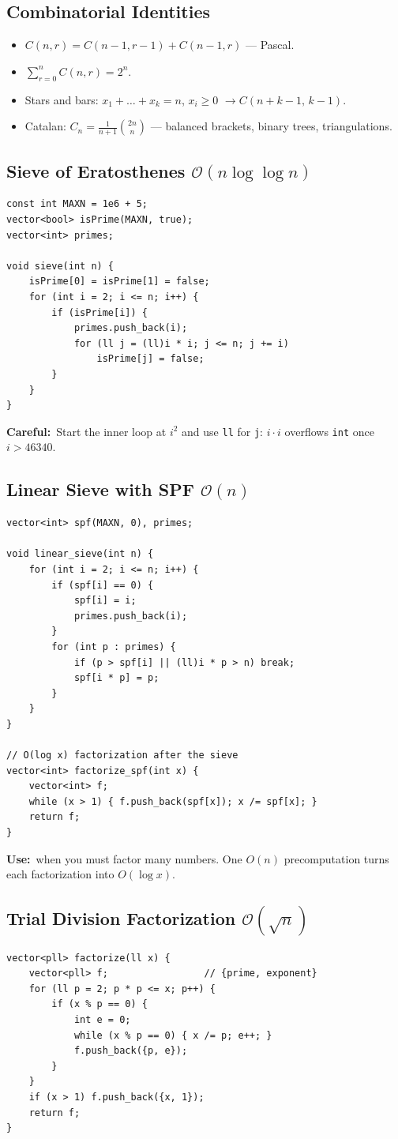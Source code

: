 \documentclass[10pt]{article}
\newcommand{\code}[1]{\texttt{\small #1}}
\newcommand{\sub}[2]{\subsection[#1]{#1\hspace{0.6em}%
  \textnormal{\color{accent2}\small$\mathcal{O}(#2)$}}}
\newcommand{\uses}[1]{{\color{accent2}\footnotesize\textbf{Use:}}~{\footnotesize #1}\par}
\newcommand{\warn}[1]{{\color{warnc}\footnotesize\textbf{Careful:}}~{\footnotesize #1}\par}
\begin{document}
\begin{multicols}{2}
\subsection{Combinatorial Identities}
\begin{itemize}
    \item $C(n,r) = C(n-1,r-1) + C(n-1,r)$ --- Pascal.
    \item $\sum_{r=0}^{n} C(n,r) = 2^n$.
    \item Stars and bars: $x_1+\dots+x_k=n$, $x_i \ge 0$
          $\rightarrow C(n+k-1,\,k-1)$.
    \item Catalan: $C_n = \frac{1}{n+1}\binom{2n}{n}$ --- balanced
          brackets, binary trees, triangulations.
\end{itemize}

\sub{Sieve of Eratosthenes}{n \log\log n}
\begin{lstlisting}
const int MAXN = 1e6 + 5;
vector<bool> isPrime(MAXN, true);
vector<int> primes;

void sieve(int n) {
    isPrime[0] = isPrime[1] = false;
    for (int i = 2; i <= n; i++) {
        if (isPrime[i]) {
            primes.push_back(i);
            for (ll j = (ll)i * i; j <= n; j += i)
                isPrime[j] = false;
        }
    }
}
\end{lstlisting}
\warn{Start the inner loop at $i^2$ and use \code{ll} for \code{j}:
$i \cdot i$ overflows \code{int} once $i > 46340$.}

\sub{Linear Sieve with SPF}{n}
\begin{lstlisting}
vector<int> spf(MAXN, 0), primes;

void linear_sieve(int n) {
    for (int i = 2; i <= n; i++) {
        if (spf[i] == 0) {
            spf[i] = i;
            primes.push_back(i);
        }
        for (int p : primes) {
            if (p > spf[i] || (ll)i * p > n) break;
            spf[i * p] = p;
        }
    }
}

// O(log x) factorization after the sieve
vector<int> factorize_spf(int x) {
    vector<int> f;
    while (x > 1) { f.push_back(spf[x]); x /= spf[x]; }
    return f;
}
\end{lstlisting}
\uses{when you must factor many numbers. One $O(n)$ precomputation
turns each factorization into $O(\log x)$.}

\sub{Trial Division Factorization}{\sqrt n}
\begin{lstlisting}
vector<pll> factorize(ll x) {
    vector<pll> f;                 // {prime, exponent}
    for (ll p = 2; p * p <= x; p++) {
        if (x % p == 0) {
            int e = 0;
            while (x % p == 0) { x /= p; e++; }
            f.push_back({p, e});
        }
    }
    if (x > 1) f.push_back({x, 1});
    return f;
}
\end{lstlisting}


\end{multicols}
\end{document}
